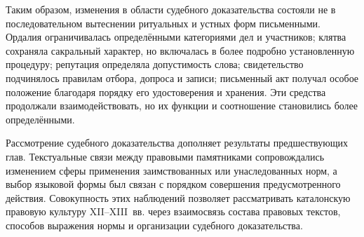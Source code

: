 Таким образом, изменения в области судебного доказательства состояли не в последовательном вытеснении ритуальных и устных форм письменными. Ордалия ограничивалась определёнными категориями дел и участников; клятва сохраняла сакральный характер, но включалась в более подробно установленную процедуру; репутация определяла допустимость слова; свидетельство подчинялось правилам отбора, допроса и записи; письменный акт получал особое положение благодаря порядку его удостоверения и хранения. Эти средства продолжали взаимодействовать, но их функции и соотношение становились более определёнными.

Рассмотрение судебного доказательства дополняет результаты предшествующих глав. Текстуальные связи между правовыми памятниками сопровождались изменением сферы применения заимствованных или унаследованных норм, а выбор языковой формы был связан с порядком совершения предусмотренного действия. Совокупность этих наблюдений позволяет рассматривать каталонскую правовую культуру XII--XIII~вв. через взаимосвязь состава правовых текстов, способов выражения нормы и организации судебного доказательства.
